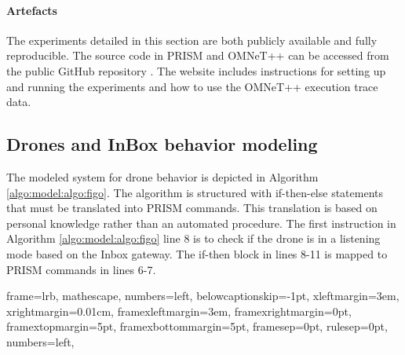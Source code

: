 \paragraph{Artefacts}
The experiments detailed in this section are both publicly available and fully reproducible. The source code in PRISM and OMNeT++ can be accessed from the public GitHub repository \cite{csi2023}. The website includes instructions for setting up and running the experiments and how to use the OMNeT++ execution trace data.



\subsection{Drones and InBox behavior modeling}
The modeled system for drone behavior is depicted in Algorithm \ref{algo:model:algo:figo}. The algorithm is structured with if-then-else statements that must be translated into PRISM commands. This translation is based on personal knowledge rather than an automated procedure. The first instruction in Algorithm \ref{algo:model:algo:figo} line 8  is to check if the drone is in a listening mode based on the Inbox gateway. The if-then block in lines 8-11 is mapped to PRISM commands in  lines 6-7.  

{
	frame=lrb,         
	mathescape,
	numbers=left,
	belowcaptionskip=-1pt,
    xleftmargin=3em,
		xrightmargin=0.01cm,
    framexleftmargin=3em,
	framexrightmargin=0pt,
	framextopmargin=5pt,
	framexbottommargin=5pt,
	framesep=0pt,
	rulesep=0pt,
	numbers=left,
}



